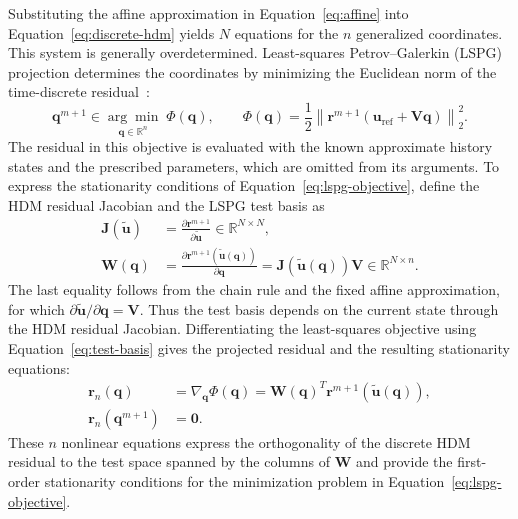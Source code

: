 \documentclass[a4paper,12pt]{article}
\newcommand{\vect}[1]{\boldsymbol{#1}}
\newcommand{\matr}[1]{\boldsymbol{#1}}
\begin{document}
Substituting the affine approximation in Equation~\eqref{eq:affine} into Equation~\eqref{eq:discrete-hdm} yields $N$ equations for the $n$ generalized coordinates. This system is generally overdetermined. Least-squares Petrov--Galerkin (LSPG) projection determines the coordinates by minimizing the Euclidean norm of the time-discrete residual~\cite{carlberg2011efficient,ares2026closure}:
\begin{equation}
 \vect{q}^{m+1}\in\underset{\vect{q}\in\mathbb R^n}{\arg\min}\;
 \Phi(\vect{q}),\qquad
 \Phi(\vect{q})=\frac12\left\|\vect{r}^{m+1}
     (\vect{u}_{\mathrm{ref}}+\matr{V}\vect{q})\right\|_2^2.
 \label{eq:lspg-objective}
\end{equation}
The residual in this objective is evaluated with the known approximate history states and the prescribed parameters, which are omitted from its arguments. To express the stationarity conditions of Equation~\eqref{eq:lspg-objective}, define the HDM residual Jacobian and the LSPG test basis as
\begin{equation}
 \begin{aligned}
 \matr{J}(\widetilde{\vect{u}})
 &=\frac{\partial\vect{r}^{m+1}}{\partial\widetilde{\vect{u}}}
 \in\mathbb R^{N\times N},\\
 \matr{W}(\vect{q})
 &=\frac{\partial\vect{r}^{m+1}(\widetilde{\vect{u}}(\vect{q}))}{\partial\vect{q}}
 =\matr{J}(\widetilde{\vect{u}}(\vect{q}))\matr{V}
 \in\mathbb R^{N\times n}.
 \end{aligned}
 \label{eq:test-basis}
\end{equation}
The last equality follows from the chain rule and the fixed affine approximation, for which $\partial\widetilde{\vect{u}}/\partial\vect{q}=\matr{V}$. Thus the test basis depends on the current state through the HDM residual Jacobian. Differentiating the least-squares objective using Equation~\eqref{eq:test-basis} gives the projected residual and the resulting stationarity equations:
\begin{equation}
 \begin{aligned}
 \vect{r}_n(\vect{q})
 &=\nabla_{\vect{q}}\Phi(\vect{q})
 =\matr{W}(\vect{q})^T\vect{r}^{m+1}(\widetilde{\vect{u}}(\vect{q})),\\
 \vect{r}_n(\vect{q}^{m+1})&=\vect{0}.
 \end{aligned}
 \label{eq:projected-residual}
\end{equation}
These $n$ nonlinear equations express the orthogonality of the discrete HDM residual to the test space spanned by the columns of $\matr{W}$ and provide the first-order stationarity conditions for the minimization problem in Equation~\eqref{eq:lspg-objective}.
\end{document}
